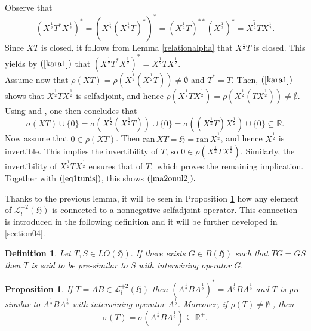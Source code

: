 \documentclass{amsart}
\makeatletter
\newtheorem{proposition}[theorem]{Proposition}
\newtheorem{definition}[theorem]{Definition}
\newcommand{\vide}{\emptyset}
\newcommand{\h}{\mathfrak{H}}
\newcommand{\ran}{\mathrm{ran}\,}
\newcommand{\adj}{^*}
\newcommand{\clo}{^{**}}
\newcommand{\tstar}{T^{*}}
\newcommand{\half}{^{\frac{1}{2}}}
\newcommand{\R}{\mathbb{R}}
\newcommand{\rplus}{\mathbb{R^+}}
\newcommand{\inclu}{\subseteq}
\newcommand{\ldeux}{\mathcal{L}_l^{+2}(\h)}
\numberwithin{equation}{section}
\renewenvironment{proof}[1][\proofname]{%
   \par\pushQED{\qed}\normalfont%
   \topsep6\p@\@plus6\p@\relax
   \trivlist\item[\hskip\labelsep\bfseries#1\@addpunct{.}]%
   \ignorespaces
}{%
   \popQED\endtrivlist\@endpefalse
}
\makeatother
\begin{document}
 \begin{proof}
 Observe that
  \begin{equation}\label{kara1}
 ( X\half \tstar X\half)\adj=( X\half (X\half T)\adj  )\adj  =  (X\half T)\clo  (X\half)\adj  = \overline{X\half T} X\half.
 \end{equation}
 Since $XT$ is closed, it follows from    Lemma \ref{relationalpha} that $X\half T$ is closed. This yields by $(\ref{kara1})$ that $
 ( X\half \tstar X\half)\adj =  X\half T X\half.$ \\
 \hspace*{0.4cm} Assume now that $\rho(XT) = \rho \left( X\half (X\half T )\right) \neq \vide$ and  $\tstar=T$.  Then, $(\ref{kara1})$ shows that $X\half T X\half$ is selfadjoint, and hence  $\rho(X\half T X\half) = \rho\left( X\half (T X\half )\right)  \neq \vide.$  Using \cite[Lemma 2.2]{hardt}  and  \cite[Lemma 2.4]{hardt}, one then concludes that
           \begin{equation}\label{eq1tunis}
          \sigma(XT) \cup \{0\}= \sigma\left( X\half (X\half T) \right) \cup \{0\} = \sigma\left( (X\half T) X\half  \right) \cup \{0\} \inclu \R .
           \end{equation}
  Now assume that   $0 \in \rho(XT)$. Then $\ran XT=\h= \ran X\half$, and hence $X\half$ is invertible. This implies the invertibility of $T$, so   $0 \in \rho(X\half T X\half).$ Similarly, the invertibility of $X\half T X\half$ ensures  that of $T,$ which proves the remaining implication.  Together with  $(\ref{eq1tunis})$, this shows $(\ref{ma2ouul2}).$
 \end{proof}


Thanks to the previous lemma, it will be seen in Proposition  \ref{theospectral} how any element of $\ldeux$ is connected to a nonnegative selfadjoint operator. This connection is introduced in the following definition and it will be further developed in \cref{section04}.
 \begin{definition}\normalfont
   Let $T,S \in LO(\h).$ If there exists   $G \in B(\h)$ such that   $TG=GS$ then    $T$ is said to be \emph{pre-similar} to   $S$ with interwining operator $G.$
 \end{definition}






\begin{proposition}\label{theospectral}
    If $ T=AB \in \ldeux$ then
   $
          (A\half B  A\half  )\adj=   A\half B  A\half
    $
 and $T$ is pre-similar to $A\half B  A\half $ with interwining operator $A\half.$      Moreover, if   $   \rho(T) \neq \vide$ ,    then
    \begin{equation*}
      \sigma(T)  = \sigma(A\half B  A\half)  \inclu \rplus.
    \end{equation*}
 \end{proposition}
\end{document}
